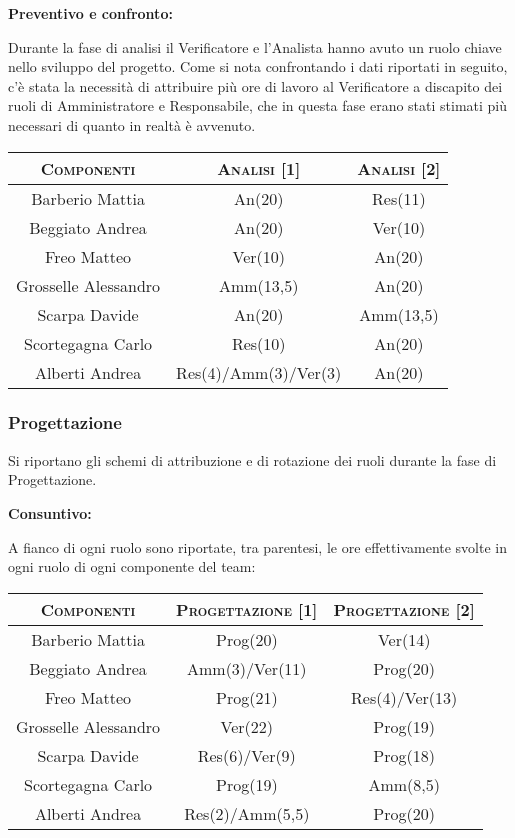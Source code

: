 \documentclass[11pt,a4paper]{article}
\begin{document}
\bigskip \bigskip
\begin{large}\textbf{Preventivo e confronto:}\end{large}
\newline
Durante la fase di analisi il Verificatore e l'Analista hanno avuto un ruolo chiave nello sviluppo del progetto.
Come si nota confrontando i dati riportati in seguito, c'è stata la necessità di attribuire più ore di lavoro al Verificatore a discapito dei ruoli di Amministratore e Responsabile, che in questa fase erano stati stimati più necessari di quanto in realtà è avvenuto.
\\
\begin{center}
\begin{tabular}{|c||c|c|}
\hline
\textsc{Componenti} & \textsc{Analisi [1]} & \textsc{Analisi [2]} \\ \hline \hline
Barberio Mattia & An(20) & Res(11) \\ \hline
Beggiato Andrea & An(20) & Ver(10) \\ \hline
Freo Matteo & Ver(10) & An(20) \\ \hline
Grosselle Alessandro & Amm(13,5) & An(20) \\ \hline
Scarpa Davide & An(20) & Amm(13,5) \\ \hline
Scortegagna Carlo & Res(10) & An(20) \\ \hline
Alberti Andrea & Res(4)/Amm(3)/Ver(3) & An(20) \\ \hline
\end{tabular}
\end{center}
\bigskip
\subsubsection{Progettazione}
Si riportano gli schemi di attribuzione e di rotazione dei ruoli durante la fase di Progettazione.

\bigskip \bigskip
\begin{large}\textbf{Consuntivo:}\end{large}
\newline
A fianco di ogni ruolo sono riportate, tra parentesi, le ore effettivamente svolte in ogni ruolo di ogni componente del team:
\\
\begin{center}
\begin{tabular}{|c||c|c|}
\hline
\textsc{Componenti} & \textsc{Progettazione [1]} & \textsc{Progettazione [2]} \\ \hline \hline
Barberio Mattia & Prog(20) & Ver(14) \\ \hline
Beggiato Andrea & Amm(3)/Ver(11) & Prog(20) \\ \hline
Freo Matteo & Prog(21) & Res(4)/Ver(13) \\ \hline
Grosselle Alessandro & Ver(22) & Prog(19) \\ \hline
Scarpa Davide & Res(6)/Ver(9) & Prog(18) \\ \hline
Scortegagna Carlo & Prog(19) & Amm(8,5) \\ \hline
Alberti Andrea & Res(2)/Amm(5,5) & Prog(20) \\ \hline
\end{tabular}
\end{center}
\end{document}

